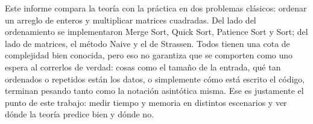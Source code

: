 Este informe compara la teoría con la práctica en dos problemas
clásicos: ordenar un arreglo de enteros y multiplicar matrices
cuadradas. Del lado del ordenamiento se implementaron Merge Sort,
Quick Sort, Patience Sort y Sort; del lado de matrices,
el método Naive y el de Strassen. Todos tienen una cota de complejidad
bien conocida, pero eso no garantiza que se comporten como uno espera
al correrlos de verdad: cosas como el tamaño de la entrada, qué tan
ordenados o repetidos están los datos, o simplemente cómo está escrito
el código, terminan pesando tanto como la notación asintótica misma.
Ese es justamente el punto de este trabajo: medir tiempo y memoria en
distintos escenarios y ver dónde la teoría predice bien y dónde no.